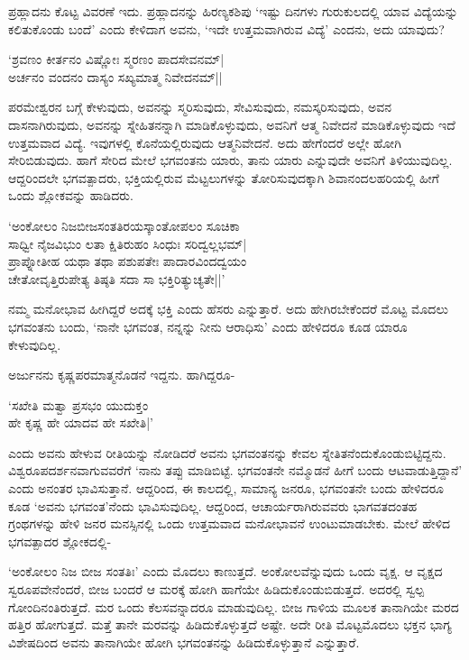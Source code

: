 ಪ್ರಹ್ಲಾದನು ಕೊಟ್ಟ ವಿವರಣೆ 
ಇದು. ಪ್ರಹ್ಲಾದನನ್ನು 
ಹಿರಣ್ಯಕಶಿಪು `ಇಷ್ಟು ದಿನಗಳು 
ಗುರುಕುಲದಲ್ಲಿ ಯಾವ 
ವಿದ್ಯೆಯನ್ನು ಕಲಿತುಕೊಂಡು 
ಬಂದೆ' ಎಂದು ಕೇಳಿದಾಗ ಅವನು, `ಇದೇ ಉತ್ತಮವಾಗಿರುವ ವಿದ್ಯೆ' ಎಂದನು, ಅದು ಯಾವುದು?

\begin{shloka}
`ಶ್ರವಣಂ ಕೀರ್ತನಂ ವಿಷ್ಣೋಃ ಸ್ಮರಣಂ ಪಾದಸೇವನಮ್|\\
ಅರ್ಚನಂ ವಂದನಂ ದಾಸ್ಯಂ ಸಖ್ಯಮಾತ್ಮ ನಿವೇದನಮ್||
\end{shloka}

ಪರಮೇಶ್ವರನ ಬಗ್ಗೆ ಕೇಳುವುದು, 
ಅವನನ್ನು ಸ್ಮರಿಸುವುದು, 
ಸೇವಿಸುವುದು, 
ನಮಸ್ಕರಿಸುವುದು, ಅವನ 
ದಾಸನಾಗಿರುವುದು, ಅವನನ್ನು 
ಸ್ನೇಹಿತನನ್ನಾಗಿ 
ಮಾಡಿಕೊಳ್ಳುವುದು, ಅವನಿಗೆ 
ಆತ್ಮ ನಿವೇದನೆ 
ಮಾಡಿಕೊಳ್ಳುವುದು ಇದೆ 
ಉತ್ತಮವಾದ ವಿದ್ಯೆ. 
ಇವುಗಳಲ್ಲಿ 
ಕೊನೆಯಲ್ಲಿರುವುದು 
ಆತ್ಮನಿವೇದನೆ. ಅದು ಹೇಗೆಂದರೆ 
ಅಲ್ಲೇ ಹೋಗಿ ಸೇರಿಬಿಡುವುದು. 
ಹಾಗೆ ಸೇರಿದ ಮೇಲೆ ಭಗವಂತನು 
ಯಾರು, ತಾನು ಯಾರು ಎನ್ನುವುದೇ 
ಅವನಿಗೆ ತಿಳಿಯುವುದಿಲ್ಲ. 
ಆದ್ದರಿಂದಲೇ ಭಗವತ್ಪಾದರು, 
ಭಕ್ತಿಯಲ್ಲಿರುವ 
ಮೆಟ್ಟಲುಗಳನ್ನು 
ತೋರಿಸುವುದಕ್ಕಾಗಿ ಶಿವಾನಂದಲಹರಿಯಲ್ಲಿ ಹೀಗೆ ಒಂದು ಶ್ಲೋಕವನ್ನು ಹಾಡಿದರು.

\begin{shloka}
`ಅಂಕೋಲಂ ನಿಜಬೀಜಸಂತತಿರಯಸ್ಕಾಂತೋಪಲಂ ಸೂಚಿಕಾ\\
ಸಾಧ್ವೀ ನೈಜವಿಭುಂ ಲತಾ ಕ್ಷಿತಿರುಹಂ ಸಿಂಧುಃ ಸರಿದ್ವಲ್ಲಭಮ್|\\
ಪ್ರಾಪ್ನೋತೀಹ ಯಥಾ ತಥಾ ಪಶುಪತೇಃ ಪಾದಾರವಿಂದದ್ವಯಂ\\
ಚೇತೋವೃತ್ತಿರುಪೇತ್ಯ ತಿಷ್ಠತಿ ಸದಾ ಸಾ ಭಕ್ತಿರಿತ್ಯುಚ್ಯತೇ||'
\end{shloka}

ನಮ್ಮ ಮನೋಭಾವ ಹೀಗಿದ್ದರೆ 
ಅದಕ್ಕೆ ಭಕ್ತಿ ಎಂದು ಹೆಸರು 
ಎನ್ನುತ್ತಾರೆ. ಅದು 
ಹೇಗಿರಬೇಕೆಂದರೆ ಮೊಟ್ಟ ಮೊದಲು 
ಭಗವಂತನು ಬಂದು, `ನಾನೇ ಭಗವಂತ, 
ನನ್ನನ್ನು ನೀನು ಆರಾಧಿಸು' ಎಂದು ಹೇಳಿದರೂ ಕೂಡ ಯಾರೂ ಕೇಳುವುದಿಲ್ಲ. 

ಅರ್ಜುನನು ಕೃಷ್ಣಪರಮಾತ್ಮನೊಡನೆ ಇದ್ದನು. ಹಾಗಿದ್ದರೂ-

\begin{shloka}
`ಸಖೇತಿ ಮತ್ವಾ ಪ್ರಸಭಂ ಯುದುಕ್ತಂ\\
ಹೇ ಕೃಷ್ಣ ಹೇ ಯಾದವ ಹೇ ಸಖೇತಿ|'
\end{shloka}

ಎಂದು ಅವನು ಹೇಳುವ ರೀತಿಯನ್ನು 
ನೋಡಿದರೆ ಅವನು ಭಗವಂತನನ್ನು 
ಕೇವಲ 
ಸ್ನೇತಿತನೆಂದುಕೊಂಡುಬಿಟ್ಟಿದ್ದನು. ವಿಶ್ವರೂಪದರ್ಶನವಾಗುವವರೆಗೆ `ನಾನು ತಪ್ಪು ಮಾಡಿಬಿಟ್ಟೆ. ಭಗವಂತನೇ ನಮ್ಮೊಡನೆ ಹೀಗೆ ಬಂದು ಆಟವಾಡುತ್ತಿದ್ದಾನೆ' ಎಂದು ಅನಂತರ ಭಾವಿಸುತ್ತಾನೆ. ಆದ್ದರಿಂದ, ಈ ಕಾಲದಲ್ಲಿ, ಸಾಮಾನ್ಯ ಜನರೂ, ಭಗವಂತನೇ ಬಂದು ಹೇಳಿದರೂ ಕೂಡ `ಅವನು ಭಗವಂತ'ನೆಂದು ಭಾವಿಸುವುದಿಲ್ಲ. ಆದ್ದರಿಂದ, ಆಚಾರ್ಯರಾಗಿರುವವರು ಭಾಗವತದಂತಹ ಗ್ರಂಥಗಳನ್ನು ಹೇಳಿ ಜನರ ಮನಸ್ಸಿನಲ್ಲಿ ಒಂದು ಉತ್ತಮವಾದ ಮನೋಭಾವನೆ ಉಂಟುಮಾಡಬೇಕು. ಮೇಲೆ ಹೇಳಿದ ಭಗವತ್ಪಾದರ ಶ್ಲೋಕದಲ್ಲಿ-

`ಅಂಕೋಲಂ ನಿಜ ಬೀಜ ಸಂತತಿಃ' 
ಎಂದು ಮೊದಲು ಕಾಣುತ್ತದೆ. 
ಅಂಕೋಲವೆನ್ನುವುದು ಒಂದು 
ವೃಕ್ಷ. ಆ ವೃಕ್ಷದ 
ಸ್ವರೂಪವೇನೆಂದರೆ, ಬೀಜ ಬಂದರೆ 
ಆ ಮರಕ್ಕೆ ಹೋಗಿ ಹಾಗೆಯೇ 
ಹಿಡಿದುಕೊಂಡುಬಿಡುತ್ತದೆ. 
ಅದರಲ್ಲಿ ಸ್ವಲ್ಪ 
ಗೋಂದಿನಂತಿರುತ್ತದೆ. ಮರ ಒಂದು 
ಕೆಲಸವನ್ನಾದರೂ ಮಾಡುವುದಿಲ್ಲ. 
ಬೀಜ ಗಾಳಿಯ ಮೂಲಕ ತಾನಾಗಿಯೇ 
ಮರದ ಹತ್ತಿರ ಹೋಗುತ್ತದೆ. 
ಮತ್ತೆ ತಾನೇ ಮರವನ್ನು 
ಹಿಡಿದುಕೊಳ್ಳುತ್ತದೆ ಅಷ್ಟೇ. ಅದೇ ರೀತಿ ಮೊಟ್ಟಮೊದಲು ಭಕ್ತನ ಭಾಗ್ಯ ವಿಶೇಷದಿಂದ ಅವನು ತಾನಾಗಿಯೇ ಹೋಗಿ ಭಗವಂತನನ್ನು ಹಿಡಿದುಕೊಳ್ಳುತ್ತಾನೆ ಎನ್ನುತ್ತಾರೆ. 

